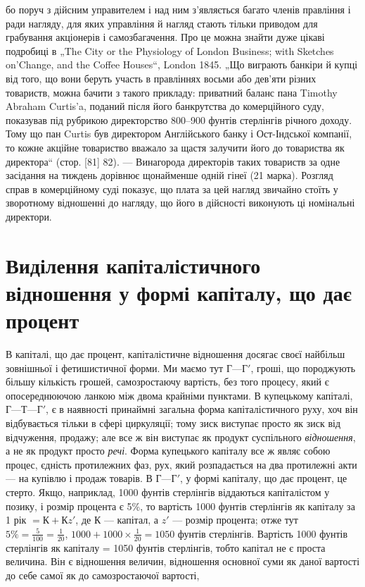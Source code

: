 \parcont{}  %
бо поруч з дійсним управителем і над ним з’являється багато
членів правління і ради нагляду, для яких управління й нагляд
стають тільки приводом для грабування акціонерів і самозбагачення.
Про це можна знайти дуже цікаві подробиці в „The
City or the Physiology of London Business; with Sketches on’Change,
and the Coffee Houses“, London 1845. „Що виграють банкіри
й купці від того, що вони беруть участь в правліннях
восьми або дев’яти різних товариств, можна бачити з такого
прикладу: приватний баланс пана Timothy Abraham Curtis’a, поданий
після його банкрутства до комерційного суду, показував
під рубрикою директорство 800--900 фунтів стерлінгів річного
доходу. Тому що пан Curtis був директором Англійського банку
і Ост-Індської компанії, то кожне акційне товариство вважало за
щастя залучити його до товариства як директора“ (стор. [81] 82). —
Винагорода директорів таких товариств за одне засідання на
тиждень дорівнює щонайменше одній гінеї (21 марка). Розгляд
справ в комерційному суді показує, що плата за цей нагляд
звичайно стоїть у зворотному відношенні до нагляду, що його
в дійсності виконують ці номінальні директори.

\section{Виділення капіталістичного відношення у формі
капіталу, що дає процент}

В капіталі, що дає процент, капіталістичне відношення досягає
своєї найбільш зовнішньої і фетишистичної форми. Ми
маємо тут $Г — Г'$, гроші, що породжують більшу кількість грошей,
самозростаючу вартість, без того процесу, який є опосереднюючою
ланкою між двома крайніми пунктами. В купецькому
капіталі, $Г — Т — Г'$, є в наявності принаймні загальна форма
капіталістичного руху, хоч він відбувається тільки в сфері циркуляції;
тому зиск виступає просто як зиск від відчуження, продажу;
але все ж він виступає як продукт суспільного \emph{відношення}, а не
як продукт просто \emph{речі}. Форма купецького капіталу все ж
являє собою процес, єдність протилежних фаз, рух, який розпадається
на два протилежні акти — на купівлю і продаж товарів.
В $Г — Г'$, у формі капіталу, що дає процент, це стерто. Якщо,
наприклад, 1000 фунтів стерлінгів віддаються капіталістом у позику,
і розмір процента є 5\%, то вартість 1000 фунтів стерлінгів
як капіталу за 1 рік $= К + Кz'$, де $К$ — капітал, а $z'$ —
розмір процента; отже тут $5\% = \frac{5}{100} = \frac{1}{20}$,
$1000 + 1000 × \frac{1}{20} = 1050$
фунтів стерлінгів. Вартість 1000 фунтів стерлінгів як
капіталу = 1050 фунтів стерлінгів, тобто капітал не є проста
величина. Він є відношення величин, відношення основної суми
як даної вартості до себе самої як до самозростаючої вартості,
\parbreak{}  %
